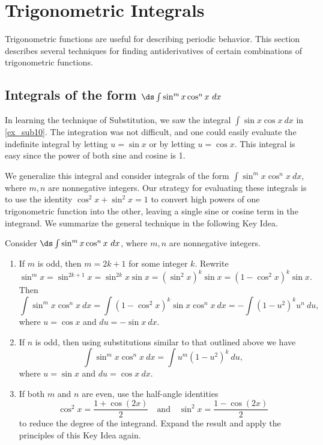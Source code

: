 

\section{Trigonometric Integrals}\label{sec:trigint}

Trigonometric functions are useful for describing periodic behavior. This section describes several techniques for finding antiderivatives of certain combinations of trigonometric functions.

\subsection{\texorpdfstring{Integrals of the form $\ds \int \sin^m x\cos^n x\ dx$}{Integrands of the form (sin x)\^{}m (cos x)\^{}n}}

In learning the technique of Substitution, we saw the integral $\int \sin x\cos x\ dx$ in \autoref{ex_sub10}. The integration was not difficult, and one could easily evaluate the indefinite integral by letting $u=\sin x$ or by letting $u = \cos x$. This integral is easy since the power of both sine and cosine is 1.

We generalize this integral and consider integrals of the form $\int \sin^mx\cos^nx\ dx$, where $m,n$ are nonnegative integers. Our strategy for evaluating these integrals is to use the identity $\cos^2x+\sin^2x=1$ to convert high powers of one trigonometric function into the other, leaving a single sine or cosine term in the integrand. We summarize the general technique in the following Key Idea.


{
\begin{keyidea}\label{idea:trig_int_1}
Consider $\ds \int \sin^mx\cos^nx\ dx$, where $m,n$ are nonnegative integers.
\begin{enumerate}
	\item	If $m$ is odd, then $m=2k+1$ for some integer $k$. Rewrite \small
		\[
		\sin^mx = \sin^{2k+1}x = \sin^{2k}x\sin x = (\sin^2x)^k\sin x = (1-\cos^2x)^k\sin x.
		\]
		\normalsize Then \small
		\[
		\int \sin^mx\cos^nx\ dx = \int (1-\cos^2x)^k\sin x\cos^nx\ dx = -\int (1-u^2)^ku^n\ du,
		\]
		\normalsize where $u = \cos x$ and $du = -\sin x\ dx$. 
	\item	If $n$ is odd, then using substitutions similar to that outlined above we have \small
		\[\int \sin^mx\cos^nx\ dx = \int u^m(1-u^2)^k\ du,\]
		\normalsize where $u = \sin x$ and $du = \cos x\ dx$.
	\item	If both $m$ and $n$ are even, use the half-angle identities \small
		\[
		\cos^2x = \frac{1+\cos (2x)}{2} \quad \text{and}\quad \sin^2x = \frac{1-\cos(2x)}2
		\]
		\normalsize to reduce the degree of the integrand. Expand the result and apply the principles of this Key Idea again.
	\end{enumerate}
\end{keyidea}
}

